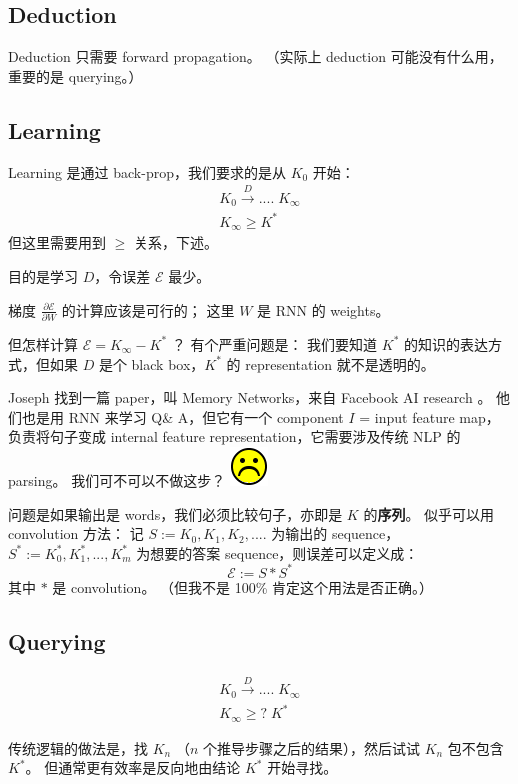 \documentclass[12pt]{article}
\newcommand*\sadface{\includegraphics[scale=0.25]{face-sad.png}}
\begin{document}
\subsection{Deduction}

Deduction 只需要 forward propagation。  （实际上 deduction 可能没有什么用，重要的是 querying。）

\subsection{Learning}

Learning 是通过 back-prop，我们要求的是从 $K_0$ 开始：
\begin{eqnarray}
K_0 \stackrel{D}{\longrightarrow} .... \; K_\infty \nonumber \\
K_\infty \ge K^*
\end{eqnarray}
但这里需要用到 $\ge$ 关系，下述。

目的是学习 $D$，令误差 $\mathcal{E}$ 最少。

梯度 $\frac{\partial \mathcal{E}}{\partial W}$ 的计算应该是可行的； 这里 $W$ 是 RNN 的 weights。

但怎样计算 $\mathcal{E} = K_\infty - K^*$ ？  有个严重问题是： 我们要知道 $K^*$ 的知识的表达方式，但如果 $D$ 是个 black box，$K^*$ 的 representation 就不是透明的。

Joseph 找到一篇 paper，叫 Memory Networks，来自 Facebook AI research \cite{Weston2015}。 他们也是用 RNN 来学习 Q\& A，但它有一个 component $I$ = input feature map，负责将句子变成 internal feature representation，它需要涉及传统 NLP 的 parsing。 我们可不可以不做这步？ \sadface

问题是如果输出是 words，我们必须比较句子，亦即是 $K$ 的\textbf{序列}。 似乎可以用 convolution 方法： 记 $S := K_0, K_1, K_2, ....$ 为输出的 sequence，$S^* := K^*_0, K^*_1, ..., K^*_m $ 为想要的答案 sequence，则误差可以定义成：
$$ \mathcal{E} := S * S^* $$
其中 $*$ 是 convolution。 （但我不是 100\% 肯定这个用法是否正确。）

\subsection{Querying}

\begin{eqnarray}
K_0 \stackrel{D}{\longrightarrow} .... \; K_\infty \nonumber \\
K_\infty \ge ? \; K^*
\end{eqnarray}

传统逻辑的做法是，找 $K_n$ （$n$ 个推导步骤之后的结果），然后试试 $K_n$ 包不包含 $K^*$。 但通常更有效率是反向地由结论 $K^*$ 开始寻找。
\end{document}

